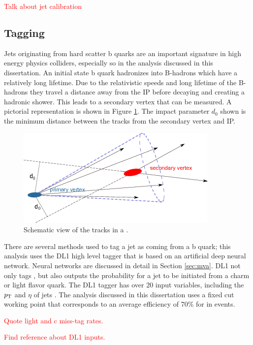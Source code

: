 		\textcolor{red}{Talk about jet calibration}

		\subsection{\bjet Tagging}\label{ssec:flavor-tagging}
			Jets originating from hard scatter b quarks are an important signature in high energy physics colliders, especially so in the analysis discussed in this dissertation. An initial state b quark hadronizes into B-hadrons which have a relatively long lifetime. Due to the relativistic speeds and long lifetime of the B-hadrons they travel a distance away from the \gls{IP} before decaying and creating a hadronic shower. This leads to a secondary vertex that can be measured. A pictorial representation is shown in Figure \ref{fig:bjet}. The impact parameter $d_0$ shown is the minimum distance between the tracks from the secondary vertex and \gls{IP}. 

			\begin{figure}[!ht]
			\centering
			\includegraphics[width=.5\textwidth,keepaspectratio=true]{chapters/chapter5_eventreconnstruction/images/b-jet-schetch.png}
			\caption{\label{fig:bjet} Schematic view of the tracks in a \bjet \cite{bjet-trigger}.}
			\end{figure}

			There are several methods used to tag a jet as coming from a b quark; this analysis uses the DL1 high level tagger \cite{b-tagging} that is based on an artificial deep neural network. Neural networks are discussed in detail in Section \ref{sec:mva}. DL1 not only tags \bjets, but also outputs the probability for a jet to be initiated from a charm or light flavor quark. The DL1 tagger has over 20 input variables, including the $p_{\text{T}}$ and $\eta$ of jets  \cite{b-tagging-input-variables}. The analysis discussed in this dissertation uses a fixed cut working point that corresponds to an average efficiency of 70\% for \bjets in \ttbar events. 

			\textcolor{red}{Quote light and c miss-tag rates.}

			\textcolor{red}{Find reference about DL1 inputs.}

